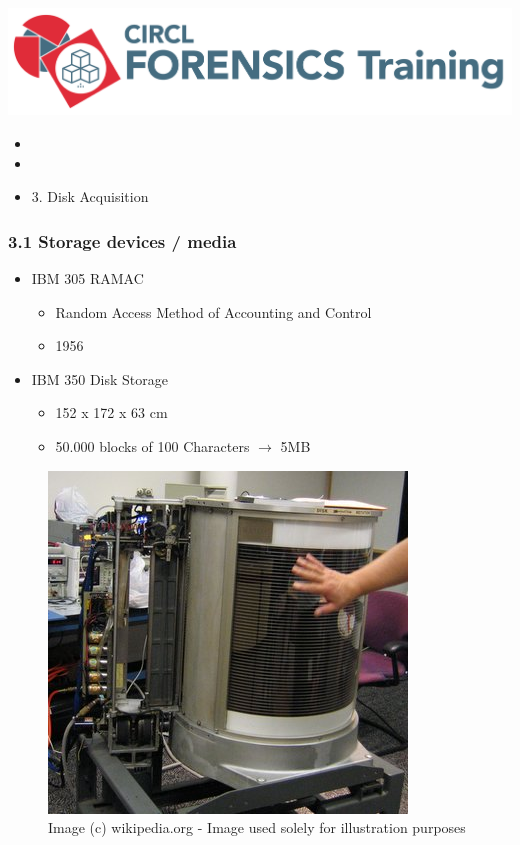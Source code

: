 

\begin{frame}
    \includegraphics[scale=0.3]{images/logo-circl-Forensics.png}
    \begin{itemize}
        \item[]
        \item[]
        \item[] 3. Disk Acquisition
    \end{itemize}
\end{frame}


\begin{frame}[fragile]
  \frametitle{3.1 Storage devices / media}
    \begin{itemize}
        \item IBM 305 RAMAC
        \begin{itemize}
            \item Random Access Method of Accounting and Control
            \item 1956
        \end{itemize}
        \item IBM 350 Disk Storage
        \begin{itemize}
            \item 152 x 172 x 63 cm
            \item 50.000 blocks of 100 Characters $\to$ 5MB
        \end{itemize}
    \end{itemize}
    \begin{figure}
        \includegraphics[scale=0.4, angle=0, trim=0 0 0 0]{images/IBM_350.jpg}
        \captionsetup{labelformat=empty,labelsep=none}
        \caption[]{\tiny Image (c) wikipedia.org - Image used solely for illustration purposes}
    \end{figure}
\end{frame}


